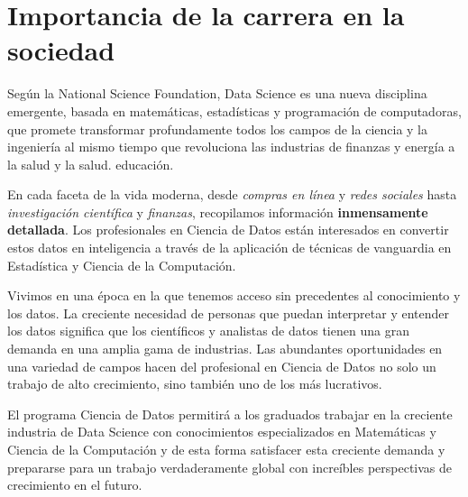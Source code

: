 \section{Importancia de la carrera en la sociedad}\label{sec:importance-in-the-society}

Según la National Science Foundation, Data Science es una nueva disciplina emergente, basada en matemáticas, estadísticas y programación de computadoras, que promete transformar profundamente todos los campos de la ciencia y la ingeniería al mismo tiempo que revoluciona las industrias de finanzas y energía a la salud y la salud. educación.

En cada faceta de la vida moderna, desde \emph{compras en línea} y \emph{redes sociales} hasta \emph{investigación científica} y \emph{finanzas}, recopilamos información \textbf{inmensamente detallada}. Los profesionales en Ciencia de Datos están interesados en convertir estos datos en inteligencia a través de la aplicación de técnicas de vanguardia en Estadística y Ciencia de la Computación.

Vivimos en una época en la que tenemos acceso sin precedentes al conocimiento y los datos. La creciente necesidad de personas que puedan interpretar y entender los datos significa que los científicos y analistas de datos tienen una gran demanda en una amplia gama de industrias. Las abundantes oportunidades en una variedad de campos hacen del profesional en Ciencia de Datos no solo un trabajo de alto crecimiento, sino también uno de los más lucrativos.

El programa Ciencia de Datos permitirá a los graduados trabajar en la creciente industria de Data Science con conocimientos especializados en Matemáticas y Ciencia de la Computación y de esta forma satisfacer esta creciente demanda y prepararse para un trabajo verdaderamente global con increíbles perspectivas de crecimiento en el futuro.